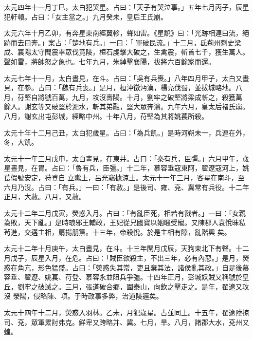 \begin{pinyinscope}
 太元四年十一月丁巳，太白犯哭星。占曰：「天子有哭泣事。」五年七月丙子，辰星犯軒轅。占曰：「女主當之。」九月癸未，皇后王氏崩。



 太元六年十月乙卯，有奔星東南經翼軫，聲如雷。《星說》曰：「光跡相連曰流，絕跡而去曰奔。」案占：「楚地有兵。」一曰：「
 軍破民流。」十二月，氐荊州刺史梁成、襄陽太守閻震率眾伐竟陵，桓石虔擊大破之，生禽震，斬首七千，獲生萬人。聲如雷，將帥怒之象也。七年九月，朱綽擊襄陽，拔將六百餘家而還。



 太元七年十一月，太白晝見，在斗。占曰：「吳有兵喪。」八年四月甲子，太白又晝見，在參。占曰：「魏有兵喪。」是月，桓沖徵沔漢，楊亮伐蜀，並拔城略地。八月，苻堅自將號百萬，九月，攻沒壽陽。十月，劉牢之破堅將梁成斬之，殺獲萬
 餘人。謝玄等又破堅於淝水，斬其弟融，堅大眾奔潰。九年六月，皇太后褚氏崩。八月，謝玄出屯彭城，經略中州。十年八月，苻堅為其將姚萇所殺。



 太元十年十二月己丑，太白犯歲星。占曰：「為兵飢。」是時河朔未一，兵連在外，冬，大飢。



 太元十一年三月戊申，太白晝見，在東井。占曰：「秦有兵，臣彊。」六月甲午，歲星晝見，在胃。占曰：「魯有兵，臣彊。」十二年，慕容垂寇東阿，翟遼寇河上，姚萇假號安定，苻登自
 立隴上，呂光竊據涼土。太元十一年三月，客星在南斗，至六月乃沒。占曰：「有兵。」一曰：「有赦。」是後司、雍、兗、冀常有兵役。十二年正月，大赦。八月，又赦。



 太元十二年二月戊寅，熒惑入月。占曰：「有亂臣死，相若有戮者。」一曰：「女親為敗，天下亂。」是時琅邪王輔政，王妃從兄國寶以姻暱受寵。又陳郡人袁悅昧私茍進，交遘主相，扇揚朋黨。十三年，帝殺悅。於是主相有隙，亂階興
 矣。



 太元十二年十月庚午，太白晝見，在斗。十三年閏月戊辰，天狗東北下有聲。十二月戊子，辰星入月，在危。占曰：「賊臣欲殺主，不出三年，必有內惡。」是月，熒惑在角亢，形色猛盛。占曰：「熒惑失其常，吏且棄其法，諸侯亂其政。」自是後慕容垂、翟遼、姚萇、苻登、慕容永並阻兵爭彊。十四年正月，彭城妖賊又稱號於皇丘，劉牢之破滅之。三月，張道破合鄉，圍泰山，向欽之擊走之。是年，翟遼又攻沒
 滎陽，侵略陳、項。于時政事多弊，治道陵遲矣。



 太元十四年十二月，熒惑入羽林。乙未，月犯歲星。占並同上。十五年，翟遼陸掠司、兗，眾軍累討弗克。鮮卑又跨略并、冀。七月，旱。八月，諸郡大水，兗州又蝗。




\end{pinyinscope}
